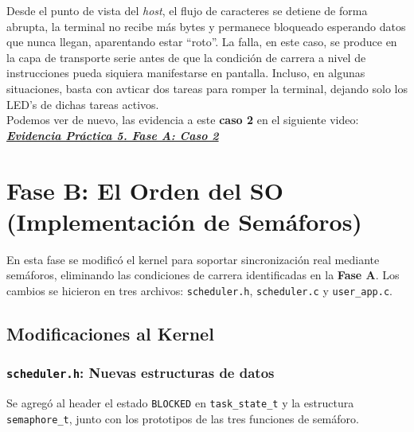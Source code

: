 \documentclass[12pt,letterpaper]{article}
\begin{document}
Desde el punto de vista del \textit{host}, el flujo de caracteres se detiene de forma abrupta, la terminal no recibe más bytes y permanece bloqueado esperando datos que nunca llegan, aparentando estar ``roto''. La falla, en este caso, se produce en la capa de transporte serie antes de que la condición de carrera a nivel de instrucciones pueda siquiera manifestarse en pantalla. Incluso, en algunas situaciones, basta con avticar dos tareas para romper la terminal, dejando solo los LED's de dichas tareas activos.\\

\noindent
Podemos ver de nuevo, las evidencia a este \textbf{caso 2} en el siguiente video:\\

\href{https://drive.google.com/file/d/1uVFFZONrw-ooMVKhCwuL4oLu651Wa1V4/view?usp=sharing&t=74}
     {\textbf{\textit{\textcolor{linkblue}{Evidencia Práctica 5. Fase A: Caso 2}}}}

\newpage

\section*{Fase B: El Orden del SO\\ (Implementación de Semáforos)}
En esta fase se modificó el kernel para soportar sincronización real mediante semáforos, eliminando las condiciones de carrera identificadas en la \textbf{Fase A}. Los cambios se hicieron en tres archivos: \texttt{scheduler.h}, \texttt{scheduler.c} y \texttt{user\_app.c}.

\subsection*{Modificaciones al Kernel}

\subsubsection*{\texttt{scheduler.h}: Nuevas estructuras de datos}
Se agregó al header el estado \texttt{BLOCKED} en \texttt{task\_state\_t} y la estructura \texttt{semaphore\_t}, junto con los prototipos de las tres funciones de semáforo.
\end{document}
